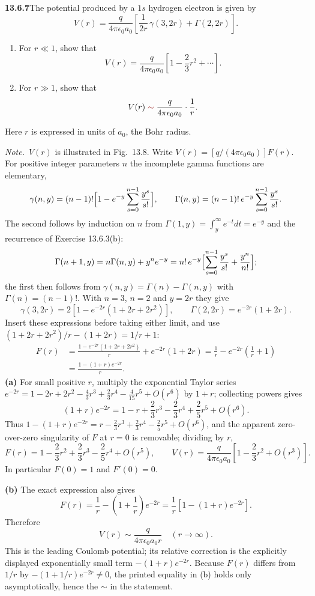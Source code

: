 \par\bigskip
\noindent\textbf{13.6.7}\quad The potential produced by a $1s$ hydrogen
electron is given by
\[
V(r)=\frac{q}{4\pi\epsilon_{0}a_{0}}
\left[\frac{1}{2r}\,\gamma(3,2r)+\Gamma(2,2r)\right].
\]
\begin{enumerate}
\item[(a)] For $r\ll1$, show that
  \[
  V(r)=\frac{q}{4\pi\epsilon_{0}a_{0}}
  \left[1-\frac{2}{3}r^{2}+\cdots\right].
  \]
\item[(b)] For $r\gg1$, show that
  \[
  V(r)\mathrel{\erratum{\sim}}\frac{q}{4\pi\epsilon_{0}a_{0}}\cdot\frac{1}{r}.
  \]
\end{enumerate}
Here $r$ is expressed in units of $a_{0}$, the Bohr radius.

\emph{Note.}~$V(r)$ is illustrated in Fig.~13.8.
\solution
Write $V(r)=[q/(4\pi\epsilon_0a_0)]F(r)$.
For positive integer parameters $n$ the incomplete gamma functions
are elementary,
\[
\gamma(n,y)=(n-1)!\Bigl[1-e^{-y}\sum_{s=0}^{n-1}\frac{y^s}{s!}\Bigr],
\qquad
\Gamma(n,y)=(n-1)!\,e^{-y}\sum_{s=0}^{n-1}\frac{y^s}{s!}.
\]
The second follows by induction on $n$ from
$\Gamma(1,y)=\int_y^\infty e^{-t}dt=e^{-y}$ and the recurrence of
Exercise 13.6.3(b):
\[
\Gamma(n+1,y)=n\Gamma(n,y)+y^ne^{-y}
=n!\,e^{-y}\Bigl[\sum_{s=0}^{n-1}\frac{y^s}{s!}+\frac{y^n}{n!}\Bigr];
\]
the first then follows from $\gamma(n,y)=\Gamma(n)-\Gamma(n,y)$
with $\Gamma(n)=(n-1)!$.  With $n=3$, $n=2$ and $y=2r$ they give
\[
\gamma(3,2r)=2\left[1-e^{-2r}(1+2r+2r^2)\right],
\qquad\Gamma(2,2r)=e^{-2r}(1+2r).
\]
Insert these expressions before taking either limit, and use
$(1+2r+2r^2)/r-(1+2r)=1/r+1$:
\begin{align*}
F(r)&=\frac{1-e^{-2r}(1+2r+2r^2)}r+e^{-2r}(1+2r)
=\frac1r-e^{-2r}\left(\frac1r+1\right)\\
&=\boxed{\frac{1-(1+r)e^{-2r}}r}.
\end{align*}
\textbf{(a)} For small positive $r$, multiply the exponential
Taylor series
$e^{-2r}=1-2r+2r^2-\frac43r^3+\frac23r^4-\frac4{15}r^5+O(r^6)$
by $1+r$; collecting powers gives
\[
(1+r)e^{-2r}=1-r+\frac23r^3-\frac23r^4+\frac25r^5+O(r^6).
\]
Thus $1-(1+r)e^{-2r}=r-\frac23r^3+\frac23r^4-\frac25r^5+O(r^6)$,
and the apparent zero-over-zero singularity of $F$ at $r=0$ is
removable; dividing by $r$,
\[
F(r)=1-\frac23r^2+\frac23r^3-\frac25r^4+O(r^5),
\qquad
\boxed{V(r)=\frac{q}{4\pi\epsilon_0a_0}
\left[1-\frac23r^2+O(r^3)\right]}.
\]
In particular $F(0)=1$ and $F'(0)=0$.

\textbf{(b)} The exact expression also gives
\[
F(r)=\frac1r-\left(1+\frac1r\right)e^{-2r}
=\frac1r[1-(1+r)e^{-2r}].
\]
Therefore
\[
\boxed{V(r)\sim\frac{q}{4\pi\epsilon_0a_0r}\quad(r\to\infty)}.
\]
This is the leading Coulomb potential; its relative correction
is the explicitly displayed exponentially small term
$-(1+r)e^{-2r}$.  Because $F(r)$ differs from $1/r$ by
$-(1+1/r)e^{-2r}\ne0$, the printed equality in (b) holds only
asymptotically, hence the $\sim$ in the statement.


